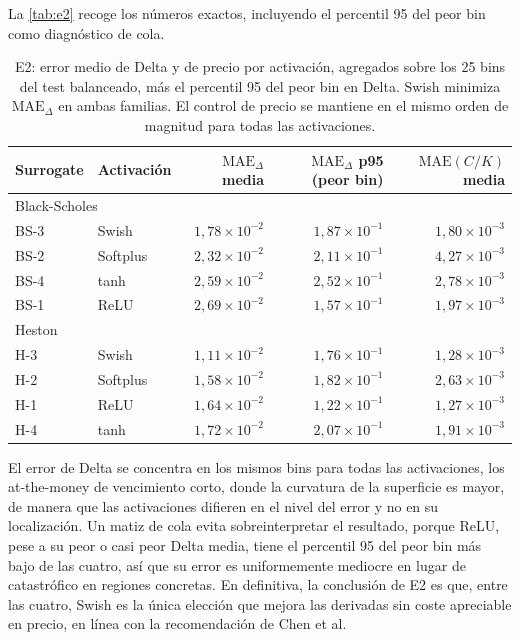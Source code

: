 \documentclass[11pt,a4paper]{article}
\begin{document}
La \autoref{tab:e2} recoge los números exactos, incluyendo el percentil 95 del peor bin como diagnóstico de cola.

\begin{table}[H]
\centering
\small
\renewcommand{\arraystretch}{1.15}
\begin{tabular}{l l r r r}
\toprule
Surrogate & Activación & $\text{MAE}_\Delta$ media & $\text{MAE}_\Delta$ p95 (peor bin) & $\text{MAE}(C/K)$ media \\
\midrule
\multicolumn{5}{l}{Black-Scholes} \\
BS-3 & Swish    & $1{,}78\times 10^{-2}$ & $1{,}87\times 10^{-1}$ & $1{,}80\times 10^{-3}$ \\
BS-2 & Softplus & $2{,}32\times 10^{-2}$ & $2{,}11\times 10^{-1}$ & $4{,}27\times 10^{-3}$ \\
BS-4 & tanh     & $2{,}59\times 10^{-2}$ & $2{,}52\times 10^{-1}$ & $2{,}78\times 10^{-3}$ \\
BS-1 & ReLU     & $2{,}69\times 10^{-2}$ & $1{,}57\times 10^{-1}$ & $1{,}97\times 10^{-3}$ \\
\midrule
\multicolumn{5}{l}{Heston} \\
H-3 & Swish    & $1{,}11\times 10^{-2}$ & $1{,}76\times 10^{-1}$ & $1{,}28\times 10^{-3}$ \\
H-2 & Softplus & $1{,}58\times 10^{-2}$ & $1{,}82\times 10^{-1}$ & $2{,}63\times 10^{-3}$ \\
H-1 & ReLU     & $1{,}64\times 10^{-2}$ & $1{,}22\times 10^{-1}$ & $1{,}27\times 10^{-3}$ \\
H-4 & tanh     & $1{,}72\times 10^{-2}$ & $2{,}07\times 10^{-1}$ & $1{,}91\times 10^{-3}$ \\
\bottomrule
\end{tabular}
\caption{E2: error medio de Delta y de precio por activación, agregados sobre los 25 bins del test balanceado, más el percentil 95 del peor bin en Delta. Swish minimiza $\text{MAE}_\Delta$ en ambas familias. El control de precio se mantiene en el mismo orden de magnitud para todas las activaciones.}
\label{tab:e2}
\end{table}

El error de Delta se concentra en los mismos bins para todas las activaciones, los at-the-money de vencimiento corto, donde la curvatura de la superficie es mayor, de manera que las activaciones difieren en el nivel del error y no en su localización. Un matiz de cola evita sobreinterpretar el resultado, porque ReLU, pese a su peor o casi peor Delta media, tiene el percentil 95 del peor bin más bajo de las cuatro, así que su error es uniformemente mediocre en lugar de catastrófico en regiones concretas. En definitiva, la conclusión de E2 es que, entre las cuatro, Swish es la única elección que mejora las derivadas sin coste apreciable en precio, en línea con la recomendación de Chen et al.
\end{document}
